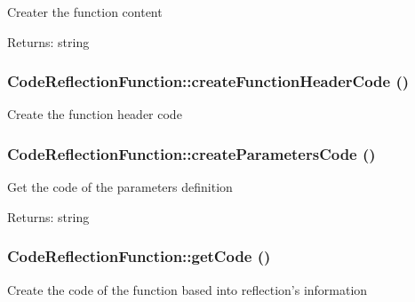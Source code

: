 Creater the function content

\begin{Desc}
\item[Returns:]string \end{Desc}
\hypertarget{class_code_reflection_function_f239516580c5c5e66c02bbe6c55d2f2f}{
\subsubsection[{createFunctionHeaderCode}]{\setlength{\rightskip}{0pt plus 5cm}CodeReflectionFunction::createFunctionHeaderCode ()}}
\label{class_code_reflection_function_f239516580c5c5e66c02bbe6c55d2f2f}


Create the function header code \hypertarget{class_code_reflection_function_003298f670f7915ad557ad10b777e0bb}{
\subsubsection[{createParametersCode}]{\setlength{\rightskip}{0pt plus 5cm}CodeReflectionFunction::createParametersCode ()}}
\label{class_code_reflection_function_003298f670f7915ad557ad10b777e0bb}


Get the code of the parameters definition

\begin{Desc}
\item[Returns:]string \end{Desc}
\hypertarget{class_code_reflection_function_eb645ce888eda144d361ccfd14eb9878}{
\subsubsection[{getCode}]{\setlength{\rightskip}{0pt plus 5cm}CodeReflectionFunction::getCode ()}}
\label{class_code_reflection_function_eb645ce888eda144d361ccfd14eb9878}


Create the code of the function based into reflection's information

